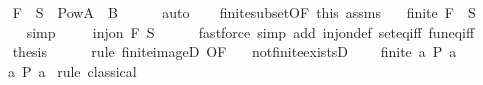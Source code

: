 \begin{isabellebody}
\ \ \isamarkupfalse%
\ {\isachardoublequoteopen}{\isacharquery}{\kern0pt}F\ {\isacharbackquote}{\kern0pt}\ {\isacharquery}{\kern0pt}S\ {\isasymsubseteq}\ Pow{\isacharparenleft}{\kern0pt}A\ {\isasymtimes}\ B{\isacharparenright}{\kern0pt}{\isachardoublequoteclose}\isanewline
\ \ \ \ \isamarkupfalse%
\ auto\isanewline
\ \ \isamarkupfalse%
\ finite{\isacharunderscore}{\kern0pt}subset{\isacharbrackleft}{\kern0pt}OF\ this{\isacharbrackright}{\kern0pt}\ assms\ \isamarkupfalse%
\ {}{\isacharcolon}{\kern0pt}\ {\isachardoublequoteopen}finite\ {\isacharparenleft}{\kern0pt}{\isacharquery}{\kern0pt}F\ {\isacharbackquote}{\kern0pt}\ {\isacharquery}{\kern0pt}S{\isacharparenright}{\kern0pt}{\isachardoublequoteclose}\isanewline
\ \ \ \ \isamarkupfalse%
\ simp\isanewline
\ \ \isamarkupfalse%
\ {}{\isacharcolon}{\kern0pt}\ {\isachardoublequoteopen}inj{\isacharunderscore}{\kern0pt}on\ {\isacharquery}{\kern0pt}F\ {\isacharquery}{\kern0pt}S{\isachardoublequoteclose}\isanewline
\ \ \ \ \isamarkupfalse%
\ {\isacharparenleft}{\kern0pt}fastforce\ simp\ add{\isacharcolon}{\kern0pt}\ inj{\isacharunderscore}{\kern0pt}on{\isacharunderscore}{\kern0pt}def\ set{\isacharunderscore}{\kern0pt}eq{\isacharunderscore}{\kern0pt}iff\ fun{\isacharunderscore}{\kern0pt}eq{\isacharunderscore}{\kern0pt}iff{\isacharparenright}{\kern0pt}\ \ \isanewline
\ \ \isamarkupfalse%
\ {\isacharquery}{\kern0pt}thesis\isanewline
\ \ \ \ \isamarkupfalse%
\ {\isacharparenleft}{\kern0pt}rule\ finite{\isacharunderscore}{\kern0pt}imageD\ {\isacharbrackleft}{\kern0pt}OF\ {}\ {}{\isacharbrackright}{\kern0pt}{\isacharparenright}{\kern0pt}\isanewline
{}\isamarkupfalse%
%
\endisatagproof
{\isafoldproof}%
%
\isadelimproof
\isanewline
%
\endisadelimproof
\isanewline
{}\isamarkupfalse%
\ not{\isacharunderscore}{\kern0pt}finite{\isacharunderscore}{\kern0pt}existsD{\isacharcolon}{\kern0pt}\isanewline
\ \ \ {\isachardoublequoteopen}{\isasymnot}\ finite\ {\isacharbraceleft}{\kern0pt}a{\isachardot}{\kern0pt}\ P\ a{\isacharbraceright}{\kern0pt}{\isachardoublequoteclose}\isanewline
\ \ \ {\isachardoublequoteopen}{\isasymexists}a{\isachardot}{\kern0pt}\ P\ a{\isachardoublequoteclose}\isanewline
%
\isadelimproof
%
\endisadelimproof
%
\isatagproof
{}\isamarkupfalse%
\ {\isacharparenleft}{\kern0pt}rule\ classical{\isacharparenright}{\kern0pt}\isanewline
\ \ \isamarkupfalse%

\end{isabellebody}
